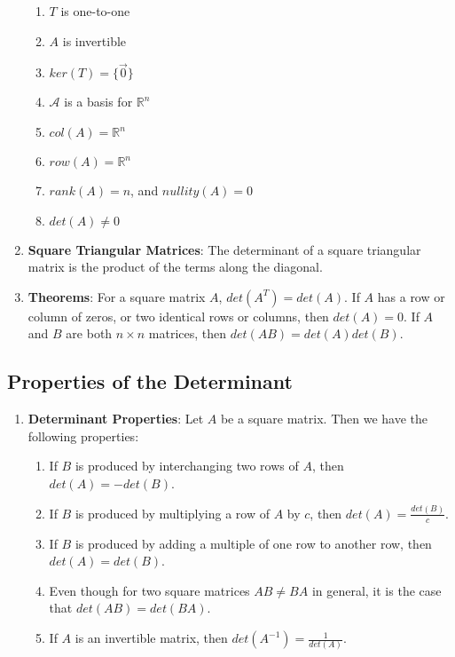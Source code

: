 \documentclass[10pt]{article}
\begin{document}
\begin{enumerate}
\begin{enumerate}
\item $T$ is one-to-one
\item $A$ is invertible
\item $ker(T) = \lbrace \vec{0} \rbrace$
\item $\mathcal{A}$ is a basis for $\mathbb{R}^n$
\item $col(A) = \mathbb{R}^n$
\item $row(A) = \mathbb{R}^n$
\item $rank(A) = n$, and $nullity(A) = 0$
\item $det(A) \neq 0$
\end{enumerate}
\item \textbf{Square Triangular Matrices}: The determinant of a square triangular matrix is the product of the terms along the diagonal.
\item \textbf{Theorems}: For a square matrix $A$, $det(A^T) = det (A)$. If $A$ has a row or column of zeros, or two identical rows or columns, then $det(A) = 0$. If $A$ and $B$ are both $n \times n$ matrices, then $det(AB) = det(A)det(B)$.
\end{enumerate}
\subsection{Properties of the Determinant}
\begin{enumerate}
\item \textbf{Determinant Properties}: Let $A$ be a square matrix. Then we have the following properties:
\begin{enumerate}
\item If $B$ is produced by interchanging two rows of $A$, then $det(A) = -det(B)$.
\item If $B$ is produced by multiplying a row of $A$ by $c$, then $det(A) = \frac{det(B)}{c}$.
\item If $B$ is produced by adding a multiple of one row to another row, then $det(A) = det(B)$.
\item Even though for two square matrices $AB \neq BA$ in general, it is the case that $det(AB) = det(BA)$. 
\item If $A$ is an invertible matrix, then $det(A^{-1}) = \frac{1}{det(A)}$.
\end{enumerate}
\end{enumerate}
\end{document}
